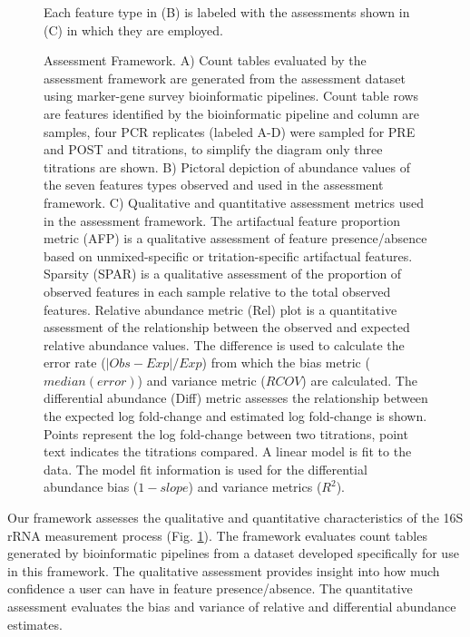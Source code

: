 \documentclass{bmcart}
\begin{document}
\begin{figure}
\caption{\label{fig:assessmentFramework}Assessment Framework. A) Count tables evaluated by the assessment framework are generated from the assessment dataset using marker-gene survey bioinformatic pipelines. Count table rows are features identified by the bioinformatic pipeline and column are samples, four PCR replicates (labeled A-D) were sampled for PRE and POST and titrations, to simplify the diagram only three titrations are shown. B) Pictoral depiction of abundance values of the seven features types observed and used in the assessment framework. C) Qualitative and quantitative assessment metrics used in the assessment framework. The artifactual feature proportion metric (AFP) is a qualitative assessment of feature presence/absence based on unmixed-specific or tritation-specific artifactual features. Sparsity (SPAR) is a qualitative assessment of the proportion of observed features in each sample relative to the total observed features. Relative abundance metric (Rel) plot is a quantitative assessment of the relationship between the observed and expected relative abundance values. The difference is used to calculate the error rate ($|Obs-Exp|/Exp$) from which the bias metric ($median(error)$) and variance metric ($RCOV$) are calculated. The differential abundance (Diff) metric assesses the relationship between the expected log fold-change and estimated log fold-change is shown. Points represent the log fold-change between two titrations, point text indicates the titrations compared. A linear model is fit to the data. The model fit information is used for the differential abundance bias ($1-slope$) and variance metrics ($R^2$).} Each feature type in (B) is labeled with the assessments shown in (C) in which they are employed.
\end{figure}

Our framework assesses the qualitative and quantitative characteristics of the 16S rRNA measurement process (Fig. \ref{fig:assessmentFramework}).
The framework evaluates count tables generated by bioinformatic pipelines from a dataset developed specifically for use in this framework.
The qualitative assessment provides insight into how much confidence a user can have in feature  presence/absence.
The quantitative assessment evaluates the bias and variance of relative and differential abundance estimates.
\end{document}
